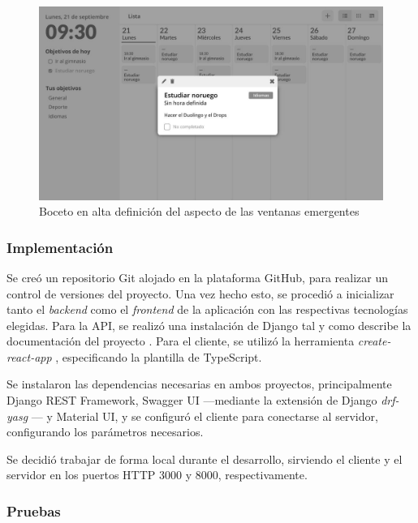 \documentclass[10pt, a4paper]{aqademic}
\begin{document}
\begin{figure}[hbt!]
	\centering
	\includegraphics[scale=1.25]{img/sprint1-wireframe-popup.jpg}
	\caption{Boceto en alta definición del aspecto de las ventanas emergentes}
\end{figure}

\clearpage

\subsubsection{Implementación}

Se creó un repositorio Git alojado en la plataforma GitHub, para realizar un control de versiones del proyecto. Una vez hecho esto, se procedió a inicializar tanto el \textit{backend} como el \textit{frontend} de la aplicación con las respectivas tecnologías elegidas. Para la API, se realizó una instalación de Django tal y como describe la documentación del proyecto \cite{noauthor_how_nodate}. Para el cliente, se utilizó la herramienta \textit{create-react-app} \cite{noauthor_create_nodate}, especificando la plantilla de TypeScript.

Se instalaron las dependencias necesarias en ambos proyectos, principalmente Django REST Framework, Swagger UI ---mediante la extensión de Django \textit{drf-yasg} \cite{vijdea_drf-yasg_nodate}--- y Material UI, y se configuró el cliente para conectarse al servidor, configurando los parámetros necesarios.

Se decidió trabajar de forma local durante el desarrollo, sirviendo el cliente y el servidor en los puertos HTTP 3000 y 8000, respectivamente.

\subsubsection{Pruebas}
\end{document}
